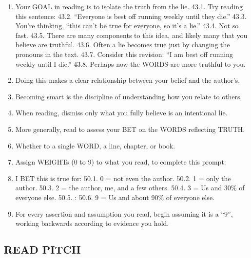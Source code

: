 \documentclass[
]{book}
\begin{document}
\begin{enumerate}
\def\labelenumi{\arabic{enumi}.}
\setcounter{enumi}{42}
\item
  Your GOAL in reading is to isolate the truth from the lie.
  43.1. Try reading this sentence:
  43.2. ``Everyone is best off running weekly until they die.''
  43.3. You're thinking, ``this can't be true for everyone, so it's a lie.''
  43.4. Not so fast.
  43.5. There are many components to this idea, and likely many that you believe
  are truthful.
  43.6. Often a lie becomes true just by changing the pronouns in the text.
  43.7. Consider this revision: ``I am best off running weekly until I die.''
  43.8. Perhaps now the WORDS are more truthful to you.
\item
  Doing this makes a clear relationship between your belief and the author's.
\item
  Becoming smart is the discipline of understanding how you relate to others.
\item
  When reading, dismiss only what you fully believe is an intentional lie.
\item
  More generally, read to assess your BET on the WORDS reflecting TRUTH.
\item
  Whether to a single WORD, a line, chapter, or book.
\item
  Assign WEIGHTs (0 to 9) to what you read, to complete this prompt:
\item
  I BET this is true for:
  50.1. 0 = not even the author.
  50.2. 1 = only the author.
  50.3. 2 = the author, me, and a few others.
  50.4. 3 = Us and 30\% of everyone else.
  50.5. :
  50.6. 9 = Us and about 90\% of everyone else.
\item
  For every assertion and assumption you read, begin assuming it is a ``9'', working
  backwards according to evidence you hold.
\end{enumerate}

\hypertarget{read-pitch}{%
\subsection{READ PITCH}\label{read-pitch}}
\end{document}
